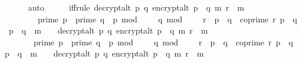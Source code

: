 \begin{isabellebody}
\ \ \ \ \isamarkupfalse%
\ auto\isanewline
\isanewline
\ \ \isamarkupfalse%
\ \isamarkupfalse%
\ iff{\isacharunderscore}{\kern0pt}rule{\isacharcolon}{\kern0pt}\ {\isachardoublequoteopen}{\isacharparenleft}{\kern0pt}decrypt{\isacharunderscore}{\kern0pt}alt\ p\ q\ {\isacharparenleft}{\kern0pt}encrypt{\isacharunderscore}{\kern0pt}alt\ {\isacharparenleft}{\kern0pt}p\ {\isacharasterisk}{\kern0pt}\ q{\isacharparenright}{\kern0pt}\ m\ r{\isacharparenright}{\kern0pt}\ {\isacharequal}{\kern0pt}\ m{\isacharparenright}{\kern0pt}\ {\isacharequal}{\kern0pt}\ \isanewline
\ \ \ \ \ \ \ \ {\isacharparenleft}{\kern0pt}{\isacharparenleft}{\kern0pt}{\isacharparenleft}{\kern0pt}prime\ p\ {\isasymand}\ prime\ q\ {\isasymand}\ p\ mod\ {}\ {\isacharequal}{\kern0pt}\ {}\ {\isasymand}\ q\ mod\ {}\ {\isacharequal}{\kern0pt}\ {}\ {\isasymand}\ r\ {\isacharless}{\kern0pt}\ p\ {\isacharasterisk}{\kern0pt}\ q\ {\isasymand}\ coprime\ r\ {\isacharparenleft}{\kern0pt}p\ {\isacharasterisk}{\kern0pt}\ q{\isacharparenright}{\kern0pt}\ {\isasymand}\ p\ {\isasymnoteq}\ q\ {\isasymand}\ m\ {\isasymnoteq}\ {\isacharbrackleft}{\kern0pt}{\isacharbrackright}{\kern0pt}{\isacharparenright}{\kern0pt}\ {\isasymlongrightarrow}\ decrypt{\isacharunderscore}{\kern0pt}alt\ p\ q\ {\isacharparenleft}{\kern0pt}encrypt{\isacharunderscore}{\kern0pt}alt\ {\isacharparenleft}{\kern0pt}p\ {\isacharasterisk}{\kern0pt}\ q{\isacharparenright}{\kern0pt}\ m\ r{\isacharparenright}{\kern0pt}\ {\isacharequal}{\kern0pt}\ m{\isacharparenright}{\kern0pt}\isanewline
\ \ \ \ \ \ {\isasymand}\ {\isacharparenleft}{\kern0pt}{\isasymnot}{\isacharparenleft}{\kern0pt}prime\ p\ {\isasymand}\ prime\ q\ {\isasymand}\ p\ mod\ {}\ {\isacharequal}{\kern0pt}\ {}\ {\isasymand}\ q\ mod\ {}\ {\isacharequal}{\kern0pt}\ {}\ {\isasymand}\ r\ {\isacharless}{\kern0pt}\ p\ {\isacharasterisk}{\kern0pt}\ q\ {\isasymand}\ coprime\ r\ {\isacharparenleft}{\kern0pt}p\ {\isacharasterisk}{\kern0pt}\ q{\isacharparenright}{\kern0pt}\ {\isasymand}\ p\ {\isasymnoteq}\ q\ {\isasymand}\ m\ {\isasymnoteq}\ {\isacharbrackleft}{\kern0pt}{\isacharbrackright}{\kern0pt}{\isacharparenright}{\kern0pt}\ {\isasymlongrightarrow}\ decrypt{\isacharunderscore}{\kern0pt}alt\ p\ q\ {\isacharparenleft}{\kern0pt}encrypt{\isacharunderscore}{\kern0pt}alt\ {\isacharparenleft}{\kern0pt}p\ {\isacharasterisk}{\kern0pt}\ q{\isacharparenright}{\kern0pt}\ m\ r{\isacharparenright}{\kern0pt}\ {\isacharequal}{\kern0pt}\ m{\isacharparenright}{\kern0pt}{\isacharparenright}{\kern0pt}\isanewline

\end{isabellebody}
